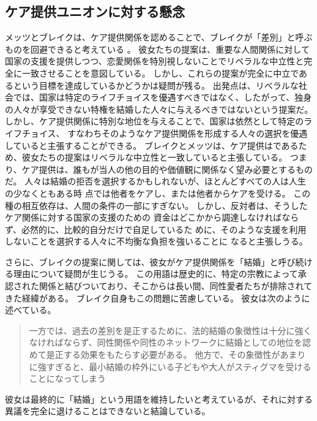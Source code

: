 \documentclass[paper=a4,book,openany]{jlreq}
\begin{document}
\subsection{ケア提供ユニオンに対する懸念}

メッツとブレイクは、ケア提供関係を認めることで、ブレイクが「差別」と呼ぶものを回避できると考えている
\citep[p.89]{brake12:_minim_marriag}。
彼女たちの提案は、重要な人間関係に対して国家の支援を提供しつつ、恋愛関係を特別視しないことでリベラルな中立性と完全に一致させることを意図している。
しかし、これらの提案が完全に中立であるという目標を達成しているかどうかは疑問が残る。
出発点は、リベラルな社会では、国家は特定のライフチョイスを優遇すべきではなく、したがって、独身の人々が享受できない特権を結婚した人々に与えるべきではないという提案だ。
しかし、ケア提供関係に特別な地位を与えることで、国家は依然として特定のライフチョイス、
すなわちそのようなケア提供関係を形成する人々の選択を優遇していると主張することができる。
ブレイクとメッツは、ケア提供はであるため、彼女たちの提案はリベラルな中立性と一致していると主張している。
つまり、ケア提供は、誰もが当人の他の目的や価値観に関係なく望み必要とするものだ。
人々は結婚の拒否を選択するかもしれないが、ほとんどすべての人は人生の少なくともある時
点では他者をケアし、または他者からケアを受ける。
この種の相互依存は、人間の条件の一部にすぎない。
しかし、反対者は、そうしたケア関係に対する国家の支援のための
資金はどこかから調達しなければならず、必然的に、比較的自分だけで自足しているた
めに、そのような支援を利用しないことを選択する人々に不均衡な負担を強いることに
なると主張しうる。

さらに、ブレイクの提案に関しては、彼女がケア提供関係を「結婚」と呼び続ける理由について疑問が生じうる。
この用語は歴史的に、特定の宗教によって承認された関係と結びついており、そこからは長い間、同性愛者たちが排除されてきた経緯がある。
ブレイク自身もこの問題に苦慮している。
彼女は次のように述べている。

\begin{quote}
一方では、過去の差別を是正するために、法的結婚の象徴性は十分に強くなければならず、同性関係や同性のネットワークに結婚としての地位を認めて是正する効果をもたらす必要がある。
他方で、その象徴性があまりに強すぎると、最小結婚の枠外にいる子どもや大人がスティグマを受けることになってしまう\citep[p.187]{brake12:_minim_marriag}
\end{quote}

彼女は最終的に「結婚」という用語を維持したいと考えているが、それに対する異議を完全に退けることはできないと結論している。
\end{document}

